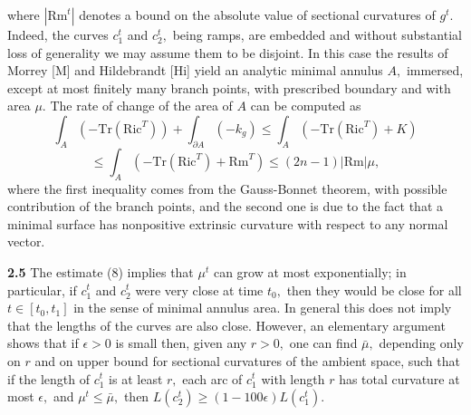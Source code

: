 \documentclass{article}
\newcommand{\e}{\epsilon}
\begin{document}
where $|\mathrm{Rm}^t|$ denotes a bound on the absolute value of
sectional curvatures of $g^t.$ Indeed, the curves $c^t_1$ and
$c^t_2,$ being ramps, are embedded and without substantial loss of
generality we may assume them to be disjoint. In this case the
results of Morrey [M] and Hildebrandt [Hi] yield an analytic
minimal annulus $A,$ immersed, except at most finitely many branch
points, with prescribed boundary and with area $\mu.$ The rate of
change of the area of $A$ can be computed as $$ \int_A
(-\mathrm{Tr}(\mathrm{Ric}^T)) +\int_{\partial A} (-k_g) \le
\int_A (-\mathrm{Tr}(\mathrm{Ric}^T)+K)$$ $$ \le \int_A
(-\mathrm{Tr}(\mathrm{Ric}^T)+\mathrm{Rm}^T) \le
(2n-1)|\mathrm{Rm}|\mu ,$$ where the first inequality comes from
the Gauss-Bonnet theorem, with possible contribution of the branch
points, and the second one is due to the fact that a minimal
surface has nonpositive extrinsic curvature with respect to any
normal vector.
\par {\bf 2.5} The estimate (8) implies that $\mu^t$ can grow at
most exponentially; in particular, if $c^t_1$ and $ c^t_2$ were
very close at time $t_0,$ then they would be close for all $t\in
[t_0,t_1]$ in the sense of minimal annulus area. In general this
does not imply that the lengths of the curves are also close.
However, an elementary argument shows that if $\e>0$ is small
then, given any $r>0, $ one can find $\bar{\mu},$ depending only
on $r$ and on upper bound for sectional curvatures of the ambient
space, such that if the length of $c^t_1$ is at least $r,$ each
arc of $c^t_1$ with length $r$ has total curvature at most $\e,$
and $\mu^t\le\bar{\mu},$ then $L(c^t_2)\ge (1-100\e)L(c^t_1).$
\end{document}
